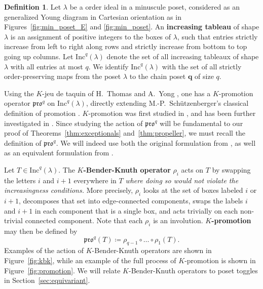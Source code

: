 \documentclass[12pt]{amsart}
\theoremstyle{definition}
\newtheorem{definition}[theorem]{Definition}
\theoremstyle{remark}
\numberwithin{equation}{section}
\newcommand{\inc}{\ensuremath{\mathrm{Inc}}}
\newcommand{\pro}{\mathfrak{pro}}
\begin{document}
\begin{definition}
Let $\lambda$ be a order ideal in a minuscule poset, considered as an generalized Young diagram in Cartesian orientation as in Figures~\ref{fig:min_poset_E} and \ref{fig:min_poset}. An {\bf increasing tableau} of shape $\lambda$ is an assignment of positive integers to the boxes of $\lambda$, such that entries strictly increase from left to right along rows and strictly increase from bottom to top going up columns. Let $\inc^q(\lambda)$ denote the set of all increasing tableaux of shape $\lambda$ with all entries at most $q$. We identify $\inc^q(\lambda)$ with the set of all strictly order-preserving maps from the poset $\lambda$ to the chain poset $\mathbf{q}$ of size $q$.
\end{definition}

Using the $K$-jeu de taquin of H.~Thomas and A.~Yong \cite{Thomas.Yong:K}, one has a $K$-promotion operator $\pro^q$ on $\inc^q(\lambda)$, directly extending M.-P.~Sch\"utzenberger's classical definition of promotion \cite{Schutzenberger:promotion}. $K$-promotion was first studied in \cite{Pechenik}, and has been further investigated in \cite{BPS, Pressey.Stokke.Visentin, Rhoades:skein, DPS, Pechenik:frames,Vorland}. Since studying the action of $\pro^q$ will be fundamental to our proof of Theorems~\ref{thm:exceptionals} and~\ref{thm:propeller}, we must recall the definition of $\pro^q$. 
We will indeed use both the original formulation from \cite{Pechenik}, as well as an equivalent formulation from \cite[Proposition~2.4]{DPS}.

Let $T \in \inc^q(\lambda)$. The {\bf $K$-Bender-Knuth operator} $\rho_i$ acts on $T$ by swapping the letters $i$ and $i+1$ everywhere in $T$ \emph{where doing so would not violate the increasingness conditions.} More precisely, $\rho_i$ looks at the set of boxes labeled $i$ or $i+1$, decomposes that set into edge-connected components, swaps the labels $i$ and $i+1$ in each component that is a single box, and acts trivially on each non-trivial connected component. 
Note that each $\rho_i$ is an involution.
{\bf $K$-promotion} may then be defined by
\[
\pro^q(T) \coloneqq \rho_{q-1} \circ \dots \circ \rho_1(T).
\]
Examples of the action of $K$-Bender-Knuth operators are shown in Figure~\ref{fig:kbk}, while an example of the full process of $K$-promotion is shown in Figure~\ref{fig:promotion}. We will relate $K$-Bender-Knuth operators to poset toggles in Section~\ref{sec:equivariant}.
\end{document}
